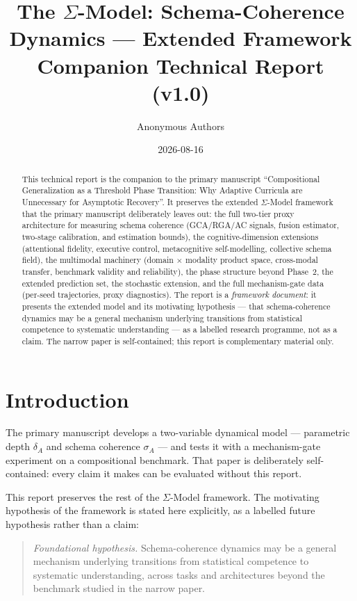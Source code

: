 \documentclass[11pt]{article}
\title{The $\Sigma$-Model: Schema-Coherence Dynamics --- Extended Framework\\
\large Companion Technical Report (v1.0)}
\author{Anonymous Authors}
\date{2026-08-16}
\theoremstyle{definition}
\theoremstyle{plain}
\begin{document}
\maketitle

\begin{abstract}
This technical report is the companion to the primary manuscript ``Compositional Generalization as a Threshold Phase Transition: Why Adaptive Curricula are Unnecessary for Asymptotic Recovery''. It preserves the extended
$\Sigma$-Model framework that the primary manuscript deliberately leaves out:
the full two-tier proxy architecture for measuring schema coherence
(GCA/RGA/AC signals, fusion estimator, two-stage calibration, and
estimation bounds), the cognitive-dimension extensions (attentional
fidelity, executive control, metacognitive self-modelling, collective
schema field), the multimodal machinery (domain $\times$ modality
product space, cross-modal transfer, benchmark validity and
reliability), the phase structure beyond Phase~2, the extended
prediction set, the stochastic extension, and the full mechanism-gate
data (per-seed trajectories, proxy diagnostics). The report is a
\emph{framework document}: it presents the extended model and its
motivating hypothesis --- that schema-coherence dynamics may be a
general mechanism underlying transitions from statistical competence to
systematic understanding --- as a labelled research programme, not as a
claim. The narrow paper is self-contained; this report is complementary
material only.
\end{abstract}

\section{Introduction}\label{sec:intro}

The primary manuscript develops a two-variable dynamical model
--- parametric depth $\delta_A$ and schema coherence $\sigma_A$ --- and
tests it with a mechanism-gate experiment on a compositional benchmark.
That paper is deliberately self-contained: every claim it makes can be
evaluated without this report.

This report preserves the rest of the $\Sigma$-Model framework. The
motivating hypothesis of the framework is stated here explicitly, as a
labelled future hypothesis rather than a claim:

\begin{quote}
\emph{Foundational hypothesis.} Schema-coherence dynamics may be a
general mechanism underlying transitions from statistical competence to
systematic understanding, across tasks and architectures beyond the
benchmark studied in the narrow paper.
\end{quote}
\end{document}
